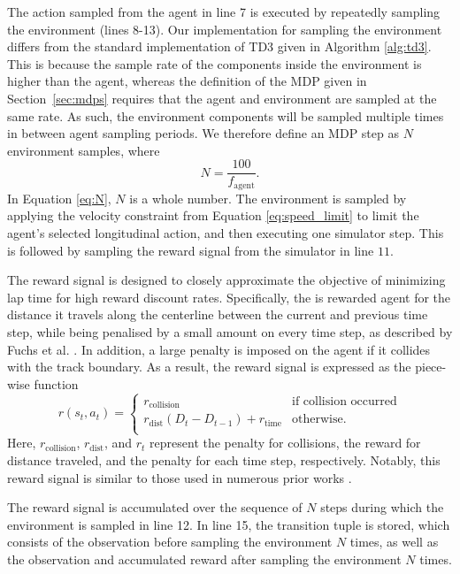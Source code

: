 The action sampled from the agent in line 7 is executed by repeatedly sampling the environment (lines 8-13).
Our implementation for sampling the environment differs from the standard implementation of TD3 given in Algorithm \ref{alg:td3}.
This is because the sample rate of the components inside the environment is higher than the agent, whereas the definition of the MDP given in Section~\ref{sec:mdps} requires that the agent and environment are sampled at the same rate.
As such, the environment components will be sampled multiple times in between agent sampling periods.
We therefore define an MDP step as $N$ environment samples, where
\begin{equation}
N = \frac{100}{f_{\text{agent}}}.
\label{eq:N}
\end{equation}
In Equation \ref{eq:N}, $N$ is a whole number.
The environment is sampled by applying the velocity constraint from Equation \ref{eq:speed_limit} to limit the agent's selected longitudinal action, and then executing one simulator step.
This is followed by sampling the reward signal from the simulator in line $11$.

The reward signal is designed to closely approximate the objective of minimizing lap time for high reward discount rates.
Specifically, the is rewarded agent for the distance it travels along the centerline between the current and previous time step, while being penalised 
by a small amount on every time step, as described by Fuchs et al. \cite{Fuchs2021}. 
In addition, a large penalty is imposed on the agent if it collides with the track boundary. 
As a result, the reward signal is expressed as the piece-wise function
\begin{dmath}
r(s_t,a_t) = 
\begin{cases}
r_{\text{collision}} & \mbox{if collision occurred} \\
r_{\text{dist}}(D_{t} - D_{t-1}) + r_{\text{time}} & \mbox{otherwise.} \\
\end{cases}
\label{eq:reward_signal}
\end{dmath}
Here, $r_{\text{collision}}$, $r_{\text{dist}}$, and $r_{t}$ represent the penalty for collisions, the reward for distance traveled, and the penalty for each time step, respectively. 
Notably, this reward signal is similar to those used in numerous prior works \cite{Song2021, Ivanov2020, Perot2017}.

The reward signal is accumulated over the sequence of $N$ steps during which the environment is sampled in line 12.
In line 15, the transition tuple is stored, which consists of the observation before sampling the environment $N$ times, as well as the observation and accumulated reward after sampling the environment $N$ times.

